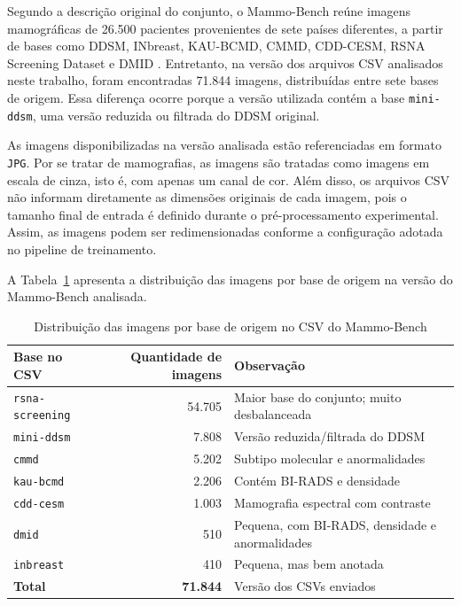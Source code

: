 \documentclass[
    12pt,
    openright,
    oneside,
    a4paper,
    english,
    brazil
]{abntex2}
\begin{document}
Segundo a descrição original do conjunto, o Mammo-Bench reúne imagens mamográficas de 26.500 pacientes provenientes de sete países diferentes, a partir de bases como DDSM, INbreast, KAU-BCMD, CMMD, CDD-CESM, RSNA Screening Dataset e DMID \cite{Bhole2025MammoBench}. Entretanto, na versão dos arquivos CSV analisados neste trabalho, foram encontradas 71.844 imagens, distribuídas entre sete bases de origem. Essa diferença ocorre porque a versão utilizada contém a base \texttt{mini-ddsm}, uma versão reduzida ou filtrada do DDSM original.

As imagens disponibilizadas na versão analisada estão referenciadas em formato \texttt{JPG}. Por se tratar de mamografias, as imagens são tratadas como imagens em escala de cinza, isto é, com apenas um canal de cor. Além disso, os arquivos CSV não informam diretamente as dimensões originais de cada imagem, pois o tamanho final de entrada é definido durante o pré-processamento experimental. Assim, as imagens podem ser redimensionadas conforme a configuração adotada no pipeline de treinamento.

A Tabela~\ref{tab:distribuicao_bases_mammobench} apresenta a distribuição das imagens por base de origem na versão do Mammo-Bench analisada.

\begin{table}[H]
\centering
\caption{Distribuição das imagens por base de origem no CSV do Mammo-Bench}
\label{tab:distribuicao_bases_mammobench}
\begin{tabular}{lrl}
\hline
\textbf{Base no CSV} & \textbf{Quantidade de imagens} & \textbf{Observação} \\ \hline
\texttt{rsna-screening} & 54.705 & Maior base do conjunto; muito desbalanceada \\
\texttt{mini-ddsm}      & 7.808  & Versão reduzida/filtrada do DDSM \\
\texttt{cmmd}           & 5.202  & Subtipo molecular e anormalidades \\
\texttt{kau-bcmd}       & 2.206  & Contém BI-RADS e densidade \\
\texttt{cdd-cesm}       & 1.003  & Mamografia espectral com contraste \\
\texttt{dmid}           & 510    & Pequena, com BI-RADS, densidade e anormalidades \\
\texttt{inbreast}       & 410    & Pequena, mas bem anotada \\ \hline
\textbf{Total}          & \textbf{71.844} & Versão dos CSVs enviados \\ \hline
\end{tabular}
\end{table}
\end{document}
